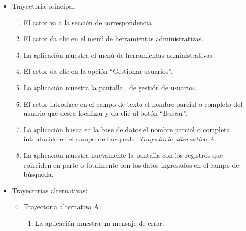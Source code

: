 			\begin{itemize}
				\item Trayectoria principal:
					\begin{enumerate}
						\item El actor va a la sección de correspondencia 
						\item El actor da clic en el menú de herramientas administrativas.
						\item La aplicación muestra el menú de herramientas administrativas.
						\item El actor da clic en la opción ``Gestionar usuarios''.
						\item La aplicación muestra la pantalla , de gestión de usuarios.
						\item El actor introduce en el campo de texto el nombre parcial o completo del usuario que desea localizar y da clic al botón ``Buscar''. 
						\item La aplicación busca en la base de datos el nombre parcial o completo introducido en el campo de búsqueda. \textsl{Trayectoria alternativa A}
						\item La aplicación muestra nuevamente la pantalla  con los registros que coinciden en parte o totalmente con los datos ingresados en el campo de búsqueda.

					\end{enumerate}
				\item Trayectorias alternativas:
					\begin{itemize}
						\item Trayectoria alternativa A:
							\begin{enumerate}
								\item La aplicación muestra un mensaje de error.
							\end{enumerate}
					\end{itemize}
			\end{itemize}

\newpage
			
